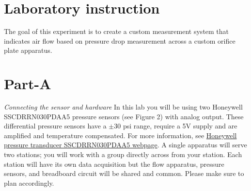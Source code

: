 \documentclass{article} %
\begin{document}
\section{Laboratory instruction}
The goal of this experiment is to create a custom measurement system that indicates air flow based on pressure drop measurement across a custom orifice plate apparatus.


\section{Part-A}
\emph{Connecting the sensor and hardware}
In this lab you will be using two Honeywell SSCDRRN030PDAA5 pressure sensors (see Figure 2) with analog output. These differential pressure sensors have a $\pm$30 psi range, require a 5V supply and are amplified and temperature compensated. For more information, see \href{https://sensing.honeywell.com/SSCDRRN030PDAA5-amplified-board-mount-pressure-sensors}{Honeywell pressure transducer SSCDRRN030PDAA5 webpage}.
A single apparatus will serve two stations; you will work with a group directly across from your station. Each station will have its own data acquisition but the flow apparatus, pressure sensors, and breadboard circuit will be  shared and common. Please make sure to plan accordingly.
\end{document}
